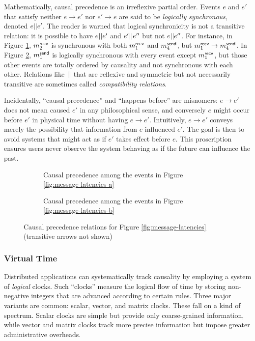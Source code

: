 \documentclass[]             %
{NASA}                       %
\theoremstyle{definition}
\begin{document}
Mathematically, causal precedence is an irreflexive partial
order. Events $e$ and $e'$ that satisfy neither $e \to e'$ nor
$e' \to e$ are said to be \emph{logically synchronous}, denoted
$e || e'$. The reader is warned that logical synchronicity is not
a transitive relation: it is possible to have $e || e'$ and
$e' || e''$ but not $e || e''$. For instance, in Figure
\ref{fig:message-co-a}, $m_{2}^{\mathsf{recv}}$ is synchronous with both
$m_{1}^{\mathsf{recv}}$ and $m_{4}^{\mathsf{send}}$, but $m_{1}^{\mathsf{recv}} \to m_{4}^{\mathsf{send}}$. In Figure
\ref{fig:message-co-b}, $m_{1}^{\mathsf{send}}$ is logically synchronous with
every event except $m_{1}^{\mathsf{recv}}$, but those other events are totally
ordered by causality and not synchronous with each other. Relations
like $||$ that are reflexive and symmetric but not necessarily
transitive are sometimes called \emph{compatibility relations}.

Incidentally, ``causal precedence'' and ``happens before'' are
misnomers: $e \to e'$ does not mean caused $e'$ in any philosophical
sense, and conversely $e$ might occur before $e'$ in physical time
without having $e \to e'$. Intuitively, $e \to e'$ conveys merely the
possibility that information from $e$ influenced $e'$. The goal is
then to avoid systems that might act as if $e'$ takes effect before
$e$. This proscription ensures users never observe the system behaving
as if the future can influence the past.

\begin{figure}
  \begingroup
  \setlength\belowcaptionskip{4ex}
  \begin{subfigure}{1\textwidth}
    \centering
    
    \caption{Causal precedence among the events in Figure \ref{fig:message-latencies-a}}
    \label{fig:message-co-a}
  \end{subfigure}
  \endgroup
  \begin{subfigure}{1\textwidth}
    \centering
    
    \caption{Causal precedence among the events in Figure \ref{fig:message-latencies-b}}
    \label{fig:message-co-b}
  \end{subfigure}
  \caption{Causal precedence relations for Figure \ref{fig:message-latencies} (transitive arrows not shown)}
  \label{fig:causal-precedence}
\end{figure}

\subsubsection{Virtual Time}
\label{ssec:timestamps}
Distributed applications can systematically track causality by
employing a system of \emph{logical} clocks. Such ``clocks'' measure
the logical flow of time by storing non-negative integers that are
advanced according to certain rules. Three major variants are common:
scalar, vector, and matrix clocks. These fall on a kind of spectrum.
Scalar clocks are simple but provide only coarse-grained information,
while vector and matrix clocks track more precise information but
impose greater administrative overheads.
\end{document}
